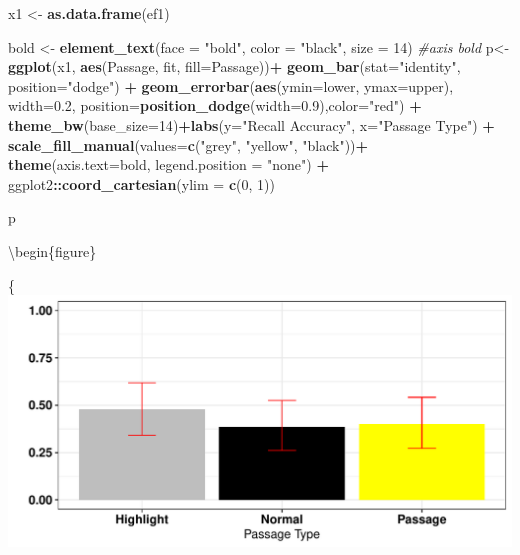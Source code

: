 \documentclass[pdf]{apa6}
\newenvironment{Shaded}{\begin{snugshade}}{\end{snugshade}}
\newcommand{\CommentTok}[1]{\textcolor[rgb]{0.56,0.35,0.01}{\textit{#1}}}
\newcommand{\DataTypeTok}[1]{\textcolor[rgb]{0.13,0.29,0.53}{#1}}
\newcommand{\DecValTok}[1]{\textcolor[rgb]{0.00,0.00,0.81}{#1}}
\newcommand{\FloatTok}[1]{\textcolor[rgb]{0.00,0.00,0.81}{#1}}
\newcommand{\KeywordTok}[1]{\textcolor[rgb]{0.13,0.29,0.53}{\textbf{#1}}}
\newcommand{\NormalTok}[1]{#1}
\newcommand{\OperatorTok}[1]{\textcolor[rgb]{0.81,0.36,0.00}{\textbf{#1}}}
\newcommand{\StringTok}[1]{\textcolor[rgb]{0.31,0.60,0.02}{#1}}
\begin{document}
\begin{Shaded}
\begin{Highlighting}[]
\NormalTok{x1 <-}\StringTok{ }\KeywordTok{as.data.frame}\NormalTok{(ef1)}

\NormalTok{bold <-}\StringTok{ }\KeywordTok{element_text}\NormalTok{(}\DataTypeTok{face =} \StringTok{"bold"}\NormalTok{, }\DataTypeTok{color =} \StringTok{"black"}\NormalTok{, }\DataTypeTok{size =} \DecValTok{14}\NormalTok{) }\CommentTok{#axis bold}
\NormalTok{p<-}\StringTok{ }\KeywordTok{ggplot}\NormalTok{(x1, }\KeywordTok{aes}\NormalTok{(Passage, fit, }\DataTypeTok{fill=}\NormalTok{Passage))}\OperatorTok{+}\StringTok{ }
\StringTok{  }\KeywordTok{geom_bar}\NormalTok{(}\DataTypeTok{stat=}\StringTok{"identity"}\NormalTok{, }\DataTypeTok{position=}\StringTok{"dodge"}\NormalTok{) }\OperatorTok{+}\StringTok{ }
\StringTok{  }\KeywordTok{geom_errorbar}\NormalTok{(}\KeywordTok{aes}\NormalTok{(}\DataTypeTok{ymin=}\NormalTok{lower, }\DataTypeTok{ymax=}\NormalTok{upper), }\DataTypeTok{width=}\FloatTok{0.2}\NormalTok{, }\DataTypeTok{position=}\KeywordTok{position_dodge}\NormalTok{(}\DataTypeTok{width=}\FloatTok{0.9}\NormalTok{),}\DataTypeTok{color=}\StringTok{"red"}\NormalTok{) }\OperatorTok{+}\StringTok{ }\KeywordTok{theme_bw}\NormalTok{(}\DataTypeTok{base_size=}\DecValTok{14}\NormalTok{)}\OperatorTok{+}\KeywordTok{labs}\NormalTok{(}\DataTypeTok{y=}\StringTok{"Recall Accuracy"}\NormalTok{, }\DataTypeTok{x=}\StringTok{"Passage Type"}\NormalTok{) }\OperatorTok{+}\StringTok{ }
\StringTok{  }\KeywordTok{scale_fill_manual}\NormalTok{(}\DataTypeTok{values=}\KeywordTok{c}\NormalTok{(}\StringTok{"grey"}\NormalTok{, }\StringTok{"yellow"}\NormalTok{, }\StringTok{"black"}\NormalTok{))}\OperatorTok{+}
\StringTok{  }\KeywordTok{theme}\NormalTok{(}\DataTypeTok{axis.text=}\NormalTok{bold, }\DataTypeTok{legend.position =} \StringTok{"none"}\NormalTok{) }\OperatorTok{+}\StringTok{ }\NormalTok{ggplot2}\OperatorTok{::}\KeywordTok{coord_cartesian}\NormalTok{(}\DataTypeTok{ylim =} \KeywordTok{c}\NormalTok{(}\DecValTok{0}\NormalTok{, }\DecValTok{1}\NormalTok{))}

\NormalTok{p }
\end{Highlighting}
\end{Shaded}

\textbackslash{}begin\{figure\}

\{\centering \includegraphics{SF_Paper_files/figure-latex/unnamed-chunk-2-1}
\end{document}
